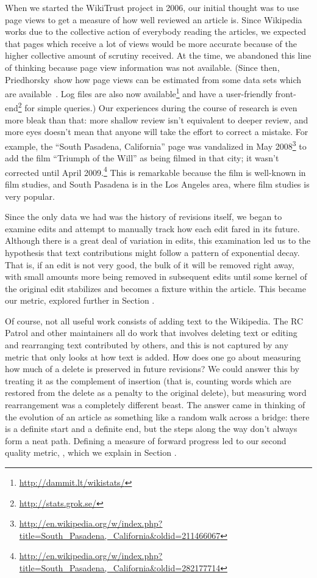 When we started the WikiTrust project in 2006, our initial thought was to
use page views to get a measure of how well reviewed an article is.
Since Wikipedia works due to the collective action of everybody
reading the articles, we expected that pages which receive a lot of
views would be more accurate because of the higher collective amount
of scrutiny received.
At the time, we abandoned this line of thinking because page view
information was not available.
(Since then, Priedhorsky~\etal show how page views can be estimated
from some data sets which are available~\cite{Priedhorsky2007}.
Log files are also now
available\footnote{\url{http://dammit.lt/wikistats/}} and
have a user-friendly front-end\footnote{\url{http://stats.grok.se/}}
for simple queries.)
Our experiences during the course of research is even more
bleak than that: more shallow review isn't equivalent to
deeper review, and more eyes doesn't mean that anyone will take
the effort to correct a mistake.
For example, the ``South Pasadena, California'' page was vandalized
in May 2008\footnote{\url{http://en.wikipedia.org/w/index.php?title=South_Pasadena,_California&oldid=211466067}}
to add the film ``Triumph of the Will'' as being filmed in that city;
it wasn't corrected until
April 2009.\footnote{\url{http://en.wikipedia.org/w/index.php?title=South_Pasadena,_California&oldid=282177714}}
This is remarkable because the film is well-known in film studies,
and South Pasadena is in the Los Angeles area,
where film studies is very popular.

Since the only data we had was the history of revisions itself,
we began to examine edits and attempt to manually track how each
edit fared in its future.
Although there is a great deal of variation in edits, this examination
led us to the hypothesis that text contributions might follow a pattern
of exponential decay.
That is, if an edit is not very good, the bulk of it will be removed
right away, with small amounts more being removed in subsequent edits
until some kernel of the original edit stabilizes and becomes a fixture
within the article.
This became our  metric, explored further in
Section .

Of course, not all useful work consists of adding text to the Wikipedia.
The RC Patrol and other maintainers all do work that involves
deleting text or editing and rearranging text contributed by others,
and this is not captured by any metric that only looks at how text is added.
How does one go about measuring how much of a delete is preserved
in future revisions?
We could answer this by treating it as the complement of insertion
(that is, counting words which are restored from the delete as a
penalty to the original delete), but measuring word rearrangement
was a completely different beast.
The answer came in thinking of the evolution of an article as something
like a random walk across a bridge: there is a definite start and a
definite end, but the steps along the way don't always form a neat path.
Defining a measure of forward progress led to our second
quality metric, , which we explain in
Section .

